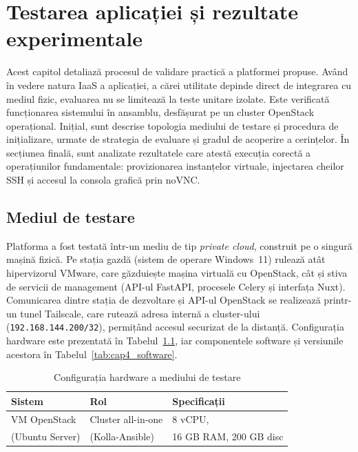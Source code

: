 \chapter{Testarea aplicației și rezultate experimentale}
\label{cap:cap4}

Acest capitol detaliază procesul de validare practică a platformei propuse. Având în vedere natura IaaS a aplicației, a cărei utilitate depinde direct de integrarea cu mediul fizic, evaluarea nu se limitează la teste unitare izolate. Este verificată funcționarea sistemului în ansamblu, desfășurat pe un cluster OpenStack operațional. Inițial, sunt descrise topologia mediului de testare și procedura de inițializare, urmate de strategia de evaluare și gradul de acoperire a cerințelor. În secțiunea finală, sunt analizate rezultatele care atestă execuția corectă a operațiunilor fundamentale: provizionarea instanțelor virtuale, injectarea cheilor SSH și accesul la consola grafică prin noVNC.

\section{Mediul de testare}
\label{sec:cap4_mediu}

Platforma a fost testată într-un mediu de tip \textit{private cloud}, construit pe o singură mașină fizică. Pe stația gazdă (sistem de operare Windows~11) rulează atât hipervizorul VMware, care găzduiește mașina virtuală cu OpenStack, cât și stiva de servicii de management (API-ul FastAPI, procesele Celery și interfața Nuxt). Comunicarea dintre stația de dezvoltare și API-ul OpenStack se realizează printr-un tunel Tailscale, care rutează adresa internă a cluster-ului (\texttt{192.168.144.200/32}), permițând accesul securizat de la distanță. Configurația hardware este prezentată în Tabelul~\ref{tab:cap4_hardware}, iar componentele software și versiunile acestora în Tabelul~\ref{tab:cap4_software}.

\begin{table}[H]
    \centering
    \caption{Configurația hardware a mediului de testare}
    \label{tab:cap4_hardware}
    \begin{tabular}{l l l}
        \hline
        \textbf{Sistem} & \textbf{Rol} & \textbf{Specificații} \\
        \hline
        VM OpenStack & Cluster all-in-one & 8 vCPU, \\
        (Ubuntu Server) & (Kolla-Ansible) & 16 GB RAM, 200 GB disc \\
        \hline
    \end{tabular}
\end{table}


